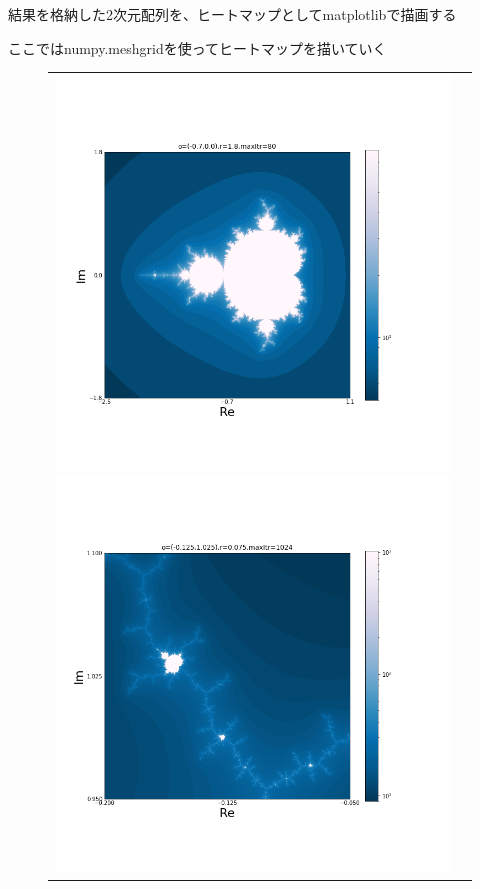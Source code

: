 \documentclass[uplatex,a4paper,11pt,oneside,openany]{jsbook}
\begin{document}
結果を格納した2次元配列を、ヒートマップとしてmatplotlibで描画する

ここではnumpy.meshgridを使ってヒートマップを描いていく


%
\begin{figure}[H]
  \centering
  \begin{tabular}{cc}
      \begin{minipage}{0.5\hsize}
      \centering
\includegraphics[bb=35 100 650 600,keepaspectratio,clip,scale=0.35]{../src/figure/mandel001.png}
      \end{minipage}
      \begin{minipage}{0.5\hsize}
      \centering
\includegraphics[bb=35 100 650 600,keepaspectratio,clip,scale=0.35]{../src/figure/mandel002.png}

\end{minipage}
\end{tabular}
\end{figure}
\end{document}
